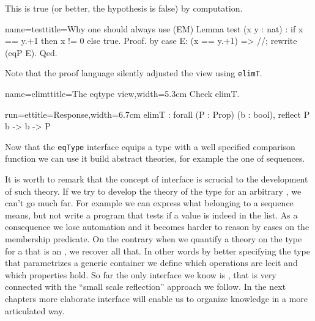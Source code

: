 This is true (or better, the hypothesis is false) by computation.

\begin{coq}{name=test}{title=Why one should always use \C{==} (EM)}
Lemma test (x y : nat) : if x == y.+1 then x != 0 else true.
Proof. by case E: (x == y.+1) => //; rewrite (eqP E). Qed.
\end{coq}





Note that the proof language silently adjusted the view
using \lstinline/elimT/.

\begin{coq}{name=elimt}{title=The eqtype view,width=5.3cm}
Check elimT.

\end{coq}
\begin{coqout}{run=et}{title=Response,width=6.7cm}
elimT : forall (P : Prop) (b : bool),
          reflect P b -> b -> P
\end{coqout}

\mcbREQUIRE{}
\mcbPROVIDE{\\in}
\label{sec:eqtypetheory}

Now that the \lstinline/eqType/ interface equips a type with a well
specified comparison function we can use it build abstract theories,
for example the one of sequences.

It is worth to remark that the concept of interface is scrucial to
the development of such theory.  If we try to develop the theory
of the type  for an arbitrary , we can't go much far.
For example we can express what belonging to a sequence means, but
not write a program that tests if a value is indeed in the list.  As a
consequence we lose automation and it becomes harder to reason by
cases on the membership predicate.
On the contrary when we quantify a theory on the type   for a
 that is an , we recover all that.  In other words
by better specifying the type that parametrizes a generic container
we define which operations are lecit and which properties hold.
So far the only interface we know is , that is very
connected with the ``small scale reflection'' approach we follow.
In the next chapters more elaborate interface will enable us to
organize knowledge in a more articulated way.

